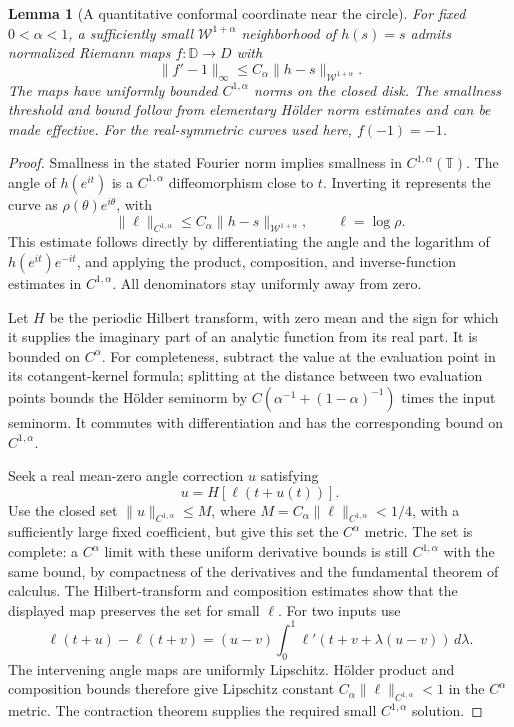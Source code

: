 \documentclass[11pt]{article}
\newtheorem{lemma}[proposition]{Lemma}
\newcommand{\T}{\mathbb T}
\begin{document}
\begin{lemma}[A quantitative conformal coordinate near the circle]
\label{lem:quantitative-conformal-coordinate}
For fixed $0<\alpha<1$, a sufficiently small
$\mathcal W^{1+\alpha}$ neighborhood of $h(s)=s$ admits normalized
Riemann maps $f:\mathbb D\to D$ with
\[
 \|f'-1\|_\infty\le C_\alpha\|h-s\|_{\mathcal W^{1+\alpha}}.
\]
The maps have uniformly bounded $C^{1,\alpha}$ norms on the closed
disk. The smallness threshold and bound follow from elementary
H\"older norm estimates and can be made effective.
For the real-symmetric curves used here, $f(-1)=-1$.
\end{lemma}
\begin{proof}
Smallness in the stated Fourier norm implies smallness in
$C^{1,\alpha}(\T)$. The angle of $h(e^{it})$ is a
$C^{1,\alpha}$ diffeomorphism close to $t$. Inverting it
represents the curve as $\rho(\theta)e^{i\theta}$, with
\[
 \|\ell\|_{C^{1,\alpha}}\le C_\alpha\|h-s\|_{\mathcal W^{1+\alpha}},
 \qquad \ell=\log\rho .
\]
This estimate follows directly by differentiating the angle and
the logarithm of $h(e^{it})e^{-it}$, and applying the product,
composition, and inverse-function estimates in $C^{1,\alpha}$.
All denominators stay uniformly away from zero.

Let $H$ be the periodic Hilbert transform, with zero mean and
the sign for which it supplies the imaginary part of an analytic
function from its real part. It is bounded on $C^\alpha$.
For completeness, subtract the value at the evaluation point
in its cotangent-kernel formula; splitting at the distance
between two evaluation points bounds the H\"older seminorm by
$C(\alpha^{-1}+(1-\alpha)^{-1})$ times the input seminorm.
It commutes with differentiation and has the corresponding
bound on $C^{1,\alpha}$.

Seek a real mean-zero angle correction $u$ satisfying
\[
 u=H[\ell(t+u(t))].
\]
Use the closed set $\|u\|_{C^{1,\alpha}}\le M$, where
$M=C_\alpha\|\ell\|_{C^{1,\alpha}}<1/4$, with a sufficiently
large fixed coefficient, but give this set the $C^\alpha$ metric.
The set is complete: a $C^\alpha$ limit with these uniform
derivative bounds is still $C^{1,\alpha}$ with the same bound,
by compactness of the derivatives and the fundamental theorem
of calculus. The Hilbert-transform and composition estimates
show that the displayed map preserves the set for small $\ell$.
For two inputs use
\[
 \ell(t+u)-\ell(t+v)
  =(u-v)\int_0^1\ell'(t+v+\lambda(u-v))\,d\lambda.
\]
The intervening angle maps are uniformly Lipschitz. H\"older
product and composition bounds therefore give Lipschitz
constant $C_\alpha\|\ell\|_{C^{1,\alpha}}<1$ in the
$C^\alpha$ metric. The contraction theorem supplies the
required small $C^{1,\alpha}$ solution.


\end{proof}
\end{document}
